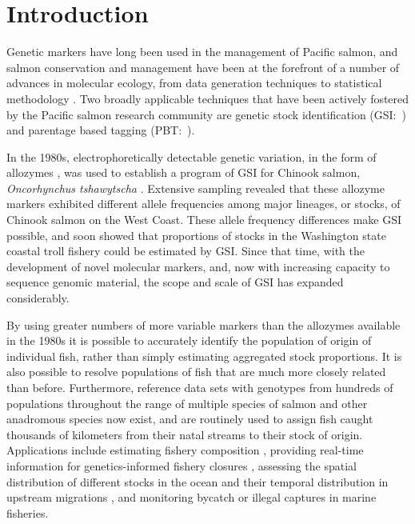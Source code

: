 
\section*{Introduction}

Genetic markers have long been used in the 
management of Pacific salmon, and salmon conservation and management have been
at the forefront of a number of advances in molecular ecology,
from data generation techniques \citep{clemento2011discovery,campbell2015genotyping,mckinney2017managing}
to statistical methodology
\citep{smouse1990genetic,anderson2002model,pella2006gibbs}.
Two broadly applicable techniques that have been
actively fostered by the Pacific salmon research community are genetic
stock identification
(GSI:~\citealt{milner1982genetic,beacham2004dna,seeb2007development})
and parentage based tagging
(PBT:~\citealt{anderson2006power, garza2007large, abadia2013large, steele2013validation}).  



 In the 1980s, electrophoretically
detectable genetic variation, in the form of allozymes
\citep{ayala1972allozymes,allendorf1981use}, was used to
establish a program of GSI for Chinook salmon,
{\em Oncorhynchus tshawytscha} \citep{milner1982genetic}.  Extensive sampling
revealed that these allozyme markers
exhibited different allele frequencies among major lineages, or stocks, of Chinook salmon on the West Coast.
These allele frequency differences make GSI possible, and
\citet{milner1985genetic} soon showed that proportions of stocks in
the Washington state coastal troll fishery could be estimated by GSI.
Since that time, with the development of novel molecular markers, and, now
with increasing capacity to sequence genomic material, the scope and scale of GSI
has expanded considerably.

By using greater numbers of more variable markers than the allozymes available
in the 1980s it is possible to accurately
identify the population of origin of individual fish, rather than simply estimating
aggregated stock proportions.  It is also possible to resolve populations of fish that
are much more closely related than before.  Furthermore, reference data sets with genotypes
from hundreds of populations throughout the range of multiple species of salmon and
other anadromous species
\citep{seeb2007development,gilbey2018microsatellite,barclay2019genetic} now exist, and are routinely used to assign fish caught thousands of
kilometers from their natal streams to their stock of origin. Applications include estimating fishery
composition \citep{satterthwaite2015stock}, providing real-time information for genetics-informed fishery closures \citep{beacham2004dna}, assessing the spatial distribution of different stocks in the
ocean \citep{urawa2009stock} and their temporal distribution in upstream migrations
\citep{hess2014monitoring},  and monitoring  bycatch \citep{hasselman2016genetic} or illegal captures \citep{wilmot1999origins} in marine fisheries.

